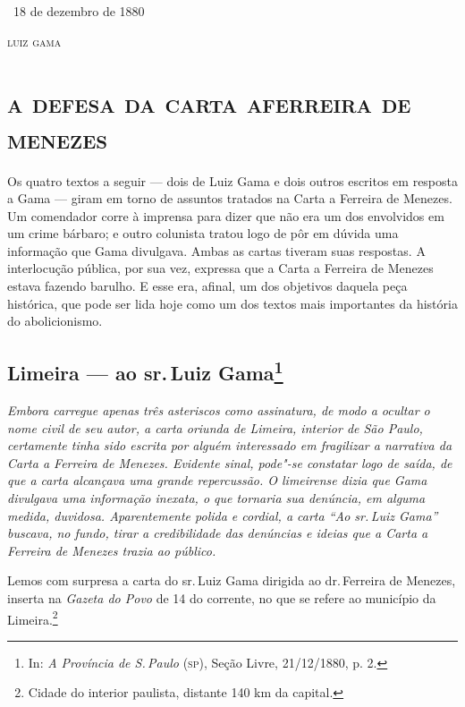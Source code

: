 \bigskip

\hfill\ 18 de dezembro de 1880\smallskip


\hfill\textsc{luiz gama}



\begingroup\makeatletter\@openrightfalse
\part[a defesa da carta a ferreira de menezes]{\textsc{a defesa da carta a\break ferreira de menezes}}

\pagebreak
\mbox{}\vfill
\thispagestyle{empty}

{\footnotesize\noindent
Os quatro textos a seguir --- dois de Luiz Gama e dois outros
escritos em resposta a Gama --- giram em torno de assuntos tratados na
Carta a Ferreira de Menezes. Um comendador corre à imprensa para dizer
que não era um dos envolvidos em um crime bárbaro; e outro colunista
tratou logo de pôr em dúvida uma informação que Gama divulgava. Ambas as
cartas tiveram suas respostas. A interlocução pública, por sua vez,
expressa que a Carta a Ferreira de Menezes estava fazendo barulho. E
esse era, afinal, um dos objetivos daquela peça histórica, que pode ser
lida hoje como um dos textos mais importantes da história do
abolicionismo.}
\@openrighttrue\makeatother\endgroup


\chapter{Limeira --- ao sr.\,Luiz Gama\footnote[*]{In: \emph{A Província de S.\,Paulo} (\textsc{sp}), Seção Livre, 21/12/1880, p. 2.}}

\begin{flushleft}
{\footnotesize\itshape
Embora carregue apenas três asteriscos como assinatura, de modo a
ocultar o nome civil de seu autor, a carta oriunda de Limeira, interior
de São Paulo, certamente tinha sido escrita por alguém interessado em
fragilizar a narrativa da Carta a Ferreira de Menezes. Evidente sinal,
pode"-se constatar logo de saída, de que a carta alcançava uma grande
repercussão. O limeirense dizia que Gama divulgava uma informação
inexata, o que tornaria sua denúncia, em alguma medida, duvidosa.
Aparentemente polida e cordial, a carta ``Ao sr.\,Luiz Gama'' buscava, no
fundo, tirar a credibilidade das denúncias e ideias que a Carta a
Ferreira de Menezes trazia ao público. }
\end{flushleft}

Lemos com surpresa a carta do sr.\,Luiz Gama dirigida ao dr.\,Ferreira de
Menezes, inserta na \emph{Gazeta do Povo} de 14 do corrente, no que se
refere ao município da Limeira.\footnote{Cidade do interior paulista,
  distante 140 km da capital.}

